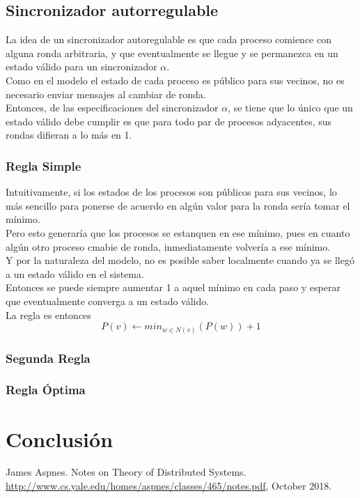 \documentclass[12pt,a4paper]{article}
\begin{document}
{    \subsection{Sincronizador autorregulable}{
        La idea de un sincronizador autoregulable es que cada proceso comience
        con alguna ronda arbitraria, y que eventualmente se llegue y se
        permanezca en un estado válido para un sincronizador $\alpha$.\\
        Como en el modelo el estado de cada proceso es público para sus vecinos,
        no es necesario enviar mensajes al cambiar de ronda.\\
        Entonces, de las especificaciones del sincronizador $\alpha$, se tiene
        que lo único que un estado válido debe cumplir es que para todo par de
        procesos adyacentes, sus rondas difieran a lo más en 1.
    }

        \subsubsection{Regla Simple}{
        Intuitivamente, si los estados de los procesos son públicos para sus
        vecinos, lo más sencillo para ponerse de acuerdo en algún valor para la
        ronda sería tomar el mínimo.\\
        Pero esto generaría que los procesos se estanquen en ese mínimo, pues en
        cuanto algún otro proceso cmabie de ronda, inmediatamente volvería a ese
        mínimo.\\
        Y por la naturaleza del modelo, no es posible saber localmente cuando ya
        se llegó a un estado válido en el sistema.\\
        Entonces se puede siempre aumentar 1 a aquel mínimo en cada paso y
        esperar que eventualmente converga a un estado válido.\\
        La regla es entonces
        \[P(v) \leftarrow min_{w \in N(v)}(P(w)) + 1\]
        }

        \subsubsection{Segunda Regla}{}

        \subsubsection{Regla Óptima}{}
}
\section{Conclusión}{}

\begin{thebibliography}{}

James Aspnes. Notes on Theory of Distributed Systems.
\href{http://www.cs.yale.edu/homes/aspnes/classes/465/notes.pdf}
{http://www.cs.yale.edu/homes/aspnes/classes/465/notes.pdf}, October 2018.

\end{thebibliography}
\end{document}
